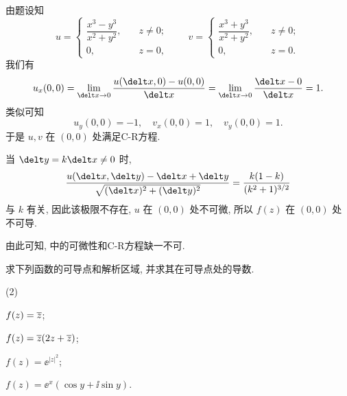 \begin{solution}
  由题设知
  \[
    u=\begin{cases}
        \dfrac{x^3-y^3}{x^2+y^2},\quad &z\neq 0;\\
        0,&z=0,
      \end{cases}\qquad
    v=\begin{cases}
        \dfrac{x^3+y^3}{x^2+y^2},\quad &z\neq 0;\\
        0,&z=0.
      \end{cases}
  \]
  我们有
  \[
     u_x(0,0)
    =\lim_{\delt x\ra 0}\frac{u(\delt x,0)-u(0,0)}{\delt x}
    =\lim_{\delt x\ra 0}\frac{\delt x-0}{\delt x}=1.
  \]
  类似可知
  \[
    u_y(0,0)=-1,\quad
    v_x(0,0)=1,\quad
    v_y(0,0)=1.
  \]
  于是 $u,v$ 在 $(0,0)$ 处满足C-R方程.

  当 $\delt y=k\delt x\neq 0$ 时,
  \[
     \frac{u(\delt x,\delt y)-\delt x+\delt y}{\sqrt{(\delt x)^2+(\delt y)^2}}
    =\frac{k(1-k)}{(k^2+1)^{3/2}}
  \]
  与 $k$ 有关, 因此该极限不存在, $u$ 在 $(0,0)$ 处不可微, 所以 $f(z)$ 在 $(0,0)$ 处不可导.
\end{solution}

由此可知, \thmCR 中的可微性和C-R方程缺一不可.

\begin{example}
  求下列函数的可导点和解析区域, 并求其在可导点处的导数.
  \begin{subexample}(2)
    \item $f(z)=\overline z$;
    \item $f(z)=\overline z(2z+\overline z)$;
    \item $f(z)=\ee^{|z|^2}$;
    \item $f(z)=\ee^x(\cos y+\ii\sin y)$.
    \label{enum:exp}
  \end{subexample}
\end{example}

